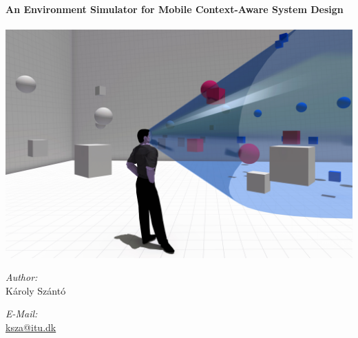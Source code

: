 \begin{titlepage}

\begin{center}


\HRule \\[0.4cm]
{ \huge \bfseries An Environment Simulator for Mobile Context-Aware System Design}\\[0.4cm]

\HRule \\[1.5cm]

\includegraphics[width=\textwidth]{gfx/egosim_logo}\\[3cm]    

\begin{minipage}{0.4\textwidth}
\begin{flushleft} \large
\emph{Author:}\\
K\'aroly Sz\'ant\'o\\
\end{flushleft}
\end{minipage}
\begin{minipage}{0.4\textwidth}
\begin{flushright} \large
\emph{E-Mail:} \\
\href{mailto:ksza@itu.dk}{ksza@itu.dk}\\
\end{flushright}
\end{minipage}\\[0.8cm]


\end{center}
\end{titlepage}
